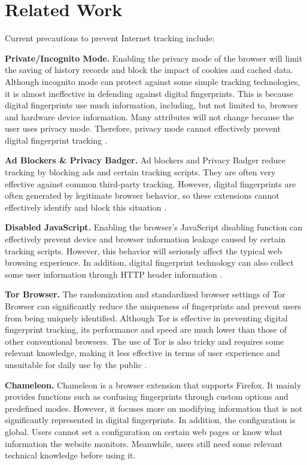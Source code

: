 \section{Related Work}
Current precautions to prevent Internet tracking include:

\textbf{Private/Incognito Mode.} Enabling the privacy mode of the browser will limit the saving of history records and block the impact of cookies and cached data. Although incognito mode can protect against some simple tracking technologies, it is almost ineffective in defending against digital fingerprints. This is because digital fingerprints use much information, including, but not limited to, browser and hardware device information. Many attributes will not change because the user uses privacy mode. Therefore, privacy mode cannot effectively prevent digital fingerprint tracking \cite{wu2017evaluating}.

\textbf{Ad Blockers \& Privacy Badger.} Ad blockers and Privacy Badger reduce tracking by blocking ads and certain tracking scripts. They are often very effective against common third-party tracking. However, digital fingerprints are often generated by legitimate browser behavior, so these extensions cannot effectively identify and block this situation \cite{mughees2017detecting}.

\textbf{Disabled JavaScript.} Enabling the browser's JavaScript disabling function can effectively prevent device and browser information leakage caused by certain tracking scripts. However, this behavior will seriously affect the typical web browsing experience. In addition, digital fingerprint technology can also collect some user information through HTTP header information \cite{bortolameotti2020headprint}.

\textbf{Tor Browser.} The randomization and standardized browser settings of Tor Browser can significantly reduce the uniqueness of fingerprints and prevent users from being uniquely identified. Although Tor is effective in preventing digital fingerprint tracking, its performance and speed are much lower than those of other conventional browsers. The use of Tor is also tricky and requires some relevant knowledge, making it less effective in terms of user experience and unsuitable for daily use by the public \cite{bortolameotti2020headprint}. 

\textbf{Chameleon.} Chameleon is a browser extension that supports Firefox. It mainly provides functions such as confusing fingerprints through custom options and predefined modes. However, it focuses more on modifying information that is not significantly represented in digital fingerprints. In addition, the configuration is global. Users cannot set a configuration on certain web pages or know what information the website monitors. Meanwhile, users still need some relevant technical knowledge before using it.